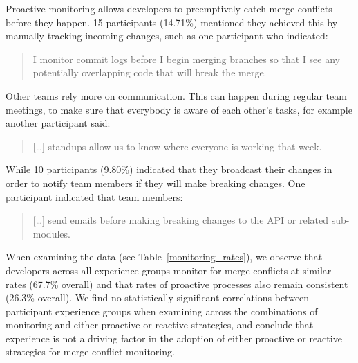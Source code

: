 Proactive monitoring allows developers to preemptively catch merge conflicts before they happen.
15 participants (14.71\%) mentioned they achieved this by manually tracking incoming changes, such as one participant who indicated:
\begin{quotation}
	I monitor commit logs before I begin merging branches so that I see any potentially overlapping code that will break the merge.
\end{quotation}
Other teams rely more on communication.
This can happen during regular team meetings, to make sure that everybody is aware of each other's tasks, for example another participant said:
\begin{quotation}
	[\ldots] standups allow us to know where everyone is working that week.
\end{quotation}
While 10 participants (9.80\%) indicated that they broadcast their changes in order to notify team members if they will make breaking changes.
One participant indicated that team members:
\begin{quotation}
	[\ldots] send emails before making breaking changes to the API or related sub-modules.
\end{quotation}

When examining the data (see Table~\ref{monitoring_rates}), we observe that developers across all experience groups monitor for merge conflicts at similar rates (67.7\% overall) and that rates of proactive processes also remain consistent (26.3\% overall).
We find no statistically significant correlations between participant experience groups when examining across the combinations of monitoring and either proactive or reactive strategies, and conclude that experience is not a driving factor in the adoption of either proactive or reactive strategies for merge conflict monitoring.

